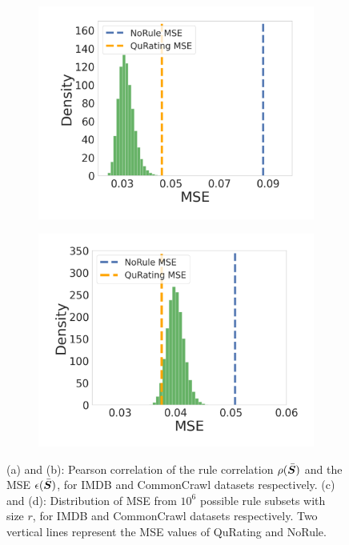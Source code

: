 \documentclass{article}
\newcommand{\bmS}{\bar{\mS}}
\begin{document}
\begin{figure}[H]
\begin{subfigure}[b]{0.23\linewidth}
    \centering
    \includegraphics[width=\linewidth]{figures/EvalA_IMDB_Single_histogram.pdf}
    \caption{}
    \label{fig:EvalA_IMDB_Single_histogram}
\end{subfigure}
\begin{subfigure}[b]{0.23\linewidth}
    \centering
    \includegraphics[width=\linewidth]{figures/EvalA_CommonCrawl_Single_histogram.pdf}
    \caption{}
    \label{fig:EvalA_CommonCrawl_Single_histogram}
\end{subfigure}
\caption{(a) and (b): Pearson correlation of the rule correlation $\rho(\bmS)$ and the MSE $\epsilon(\bmS)$, for IMDB and CommonCrawl datasets respectively. (c) and (d): Distribution of MSE from $10^6$ possible rule subsets with size $r$, for IMDB and CommonCrawl datasets respectively. Two vertical lines represent the MSE values of QuRating and NoRule.}
\end{figure}
\end{document}
